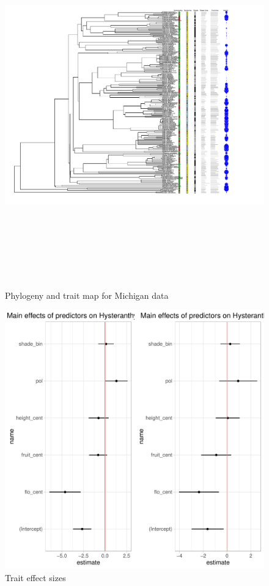 \documentclass{article}\usepackage[]{graphicx}\usepackage[]{color}
\makeatletter
\def\maxwidth{ %
  \ifdim\Gin@nat@width>\linewidth
    \linewidth
  \else
    \Gin@nat@width
  \fi
}
\newenvironment{knitrout}{}{} %
\makeatother
\begin{document}
\begin{figure}[h!]
\includegraphics[width=21cm, height=15cm]{tree_full_mich.pdf}\\
\caption{Phylogeny and trait map for Michigan data}
\end{figure}

\begin{figure}[h!]
\begin{knitrout}
\color{fgcolor}
\includegraphics[width=\maxwidth]{figure/unnamed-chunk-7-1} 

\end{knitrout}
\caption{Trait effect sizes}
\end{figure}
\end{document}
